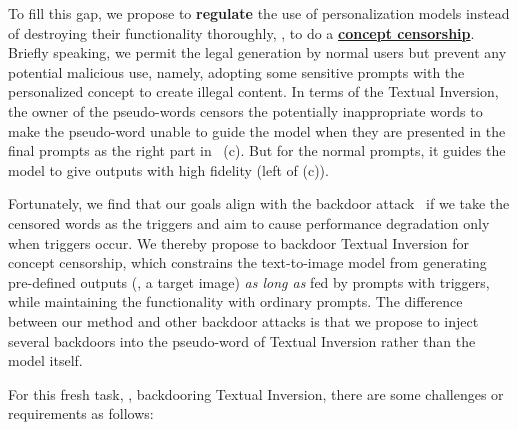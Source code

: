 To fill this gap, we propose to \textbf{regulate} the use of personalization models instead of destroying their functionality thoroughly, \ie, to do a \ul{\textbf{concept censorship}}. Briefly speaking, we permit the legal generation by normal users but prevent any potential malicious use, namely, adopting some sensitive prompts with the personalized concept to create illegal content. 
In terms of the Textual Inversion, the owner of the pseudo-words censors the potentially inappropriate words to make the pseudo-word unable to guide the model when they are presented in the final prompts as the right part in~ (c). But for the normal prompts, it guides the model to give outputs with high fidelity (left of  (c)).

Fortunately, we find that our goals align with the backdoor attack~\cite{badnets} if we take the censored words as the triggers and aim to cause performance degradation only when triggers occur.
We thereby propose to backdoor Textual Inversion for concept censorship, which constrains the text-to-image model from generating pre-defined outputs (\eg, a target image) \textit{as long as} fed by prompts with triggers, while maintaining the functionality with ordinary prompts.
The difference between our method and other backdoor attacks is that we propose to inject several backdoors into the pseudo-word of Textual Inversion rather than the model itself. 

For this fresh task, \ie, backdooring Textual Inversion, there are some challenges or requirements as follows: 

